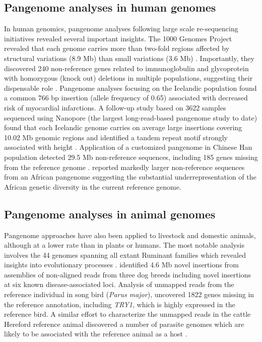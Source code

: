 \documentclass[../main.tex]{subfiles}
\begin{document}
\subsection*{Pangenome analyses in human genomes}
In human genomics, pangenome analyses following large scale re-sequencing initiatives revealed several important insights. The 1000 Genomes Project revealed that each genome carries more than two-fold regions affected by structural variations (8.9 Mb) than small variations (3.6 Mb) \citep{10002015global}. Importantly, they discovered 240 non-reference genes related to immunoglobulin and glycoprotein with homozygous (knock out) deletions in multiple populations, suggesting their dispensable role \citep{sudmant2015integrated}. Pangenome analyses focusing on the Icelandic population \citep{kehr2017diversity} found a common 766 bp insertion (allele frequency of 0.65) associated with decreased risk of myocardial infarctions. A follow-up study based on 3622 samples sequenced using Nanopore (the largest long-read-based pangenome study to date) found that each Icelandic genome carries on average large insertions covering 10.02 Mb genomic regions and identified a tandem repeat motif strongly associated with height \citep{beyter2020long}. Application of a customized pangenome in Chinese Han population detected 29.5 Mb non-reference sequences, including 185 genes missing from the reference genome \citep{duan2019hupan}. \citet{sherman2019assembly} reported markedly larger non-reference sequences from an African pangenome suggesting the substantial underrepresentation of the African genetic diversity in the current reference genome.

\subsection*{Pangenome analyses in animal genomes}
Pangenome approaches have also been applied to livestock and domestic animals, although at a lower rate than in plants or humans. The most notable analysis involves the 44 genomes spanning all extant Ruminant families which revealed insights into evolutionary processes \citep{chen2019large}. \citet{holden2018assembly} identified 4.6 Mb novel insertions from assemblies of non-aligned reads from three dog breeds including  novel insertions at six known disease-associated loci. Analysis of unmapped reads from the reference individual in song bird (\emph{Parus major}), \citet{laine2019exploring} uncovered 1822 genes missing in the reference annotation, including \emph{TRY1}, which is highly expressed in the reference bird. A similar effort to characterize the unmapped reads in the cattle Hereford reference animal discovered a number of parasite genomes which are likely to be associated with the reference animal as a host \citep{whitacre2015s}. 
\end{document}
